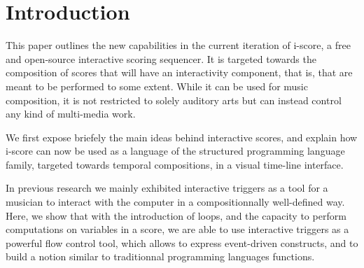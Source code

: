 \documentclass{article}
\title{\papertitle}
\begin{document}
%
\capstartfalse
\maketitle
\capstarttrue
%
\begin{abstract}
     The development and authoring of interactive music or applications, such as user interfaces for arts \& exhibitions
     has traditionally been done with tools that pertain to two broad metaphors. 
     Cue-based environments work by making groups of parameters and sending them to remote devices, 
     while more interactive applications are generally written in generic art-oriented 
     programming environments, such as Max/MSP, Processing or OpenFrameworks.
     In this paper, we argue about the specific issues that arise in such environments, and we present 
     the current version of the i-score sequencer. It is an extensive software suite that bridges
     the gap between time-based, logic-based and flow-based interactive application authoring tools. 
     This is done in a single cohesive graphical user interface, built upon a few simple and novel primitives that give to the composer the expressive power of structured programming, in a time line adapted to the notation of parameter-oriented interactive music.    
\end{abstract}
%

\section{Introduction}\label{sec:introduction}
This paper outlines the new capabilities in the current iteration of i-score, 
a free and open-source interactive scoring sequencer.
It is targeted towards the composition of scores that will have 
an interactivity component, that is, that are meant to be performed 
to some extent.
While it can be used for music composition, it is not restricted to solely auditory arts
but can instead control any kind of multi-media work.

We first expose briefely the main ideas behind interactive scores, and explain 
how i-score can now be used as a language of the structured programming language 
family, targeted towards temporal compositions, in a visual time-line interface.

In previous research we mainly exhibited interactive triggers as a tool for a musician 
to interact with the computer in a compositionnally well-defined way.
Here, we show that with the introduction of loops, and the capacity to perform computations 
on variables in a score, we are able to use interactive triggers as a powerful flow control tool, which 
allows to express event-driven constructs, and to build a notion similar to traditionnal programming 
languages functions.
\end{document}
